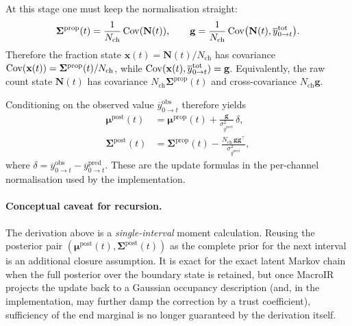 \documentclass[11pt]{article}
\begin{document}
At this stage one must keep the normalisation straight:
\[
  \boldsymbol{\Sigma}^{\text{prop}}(t)
  =
  \frac{1}{N_{\text{ch}}}\operatorname{Cov}(\mathbf{N}(t)),
  \qquad
  \mathbf{g}
  =
  \frac{1}{N_{\text{ch}}}
  \operatorname{Cov}\bigl(\mathbf{N}(t),\overline{y}^{\text{tot}}_{0\to t}\bigr).
\]
Therefore the fraction state
\(
  \mathbf{x}(t)=\mathbf{N}(t)/N_{\text{ch}}
\)
has covariance
\(
  \operatorname{Cov}(\mathbf{x}(t))=\boldsymbol{\Sigma}^{\text{prop}}(t)/N_{\text{ch}}
\),
while
\(
  \operatorname{Cov}(\mathbf{x}(t),\overline{y}^{\text{tot}}_{0\to t})=\mathbf{g}
\).
Equivalently, the raw count state \(\mathbf{N}(t)\) has covariance
\(
  N_{\text{ch}}\boldsymbol{\Sigma}^{\text{prop}}(t)
\)
and cross-covariance
\(
  N_{\text{ch}}\mathbf{g}
\).

Conditioning on the observed value
\(\overline{y}^{\text{obs}}_{0\to t}\) therefore yields
\begin{align*}
  \boldsymbol{\mu}^{\text{post}}(t)
  &=
  \boldsymbol{\mu}^{\text{prop}}(t)
  +
  \frac{\mathbf{g}}{\sigma^2_{\overline{y}^{\text{pred}}}}
  \,\delta,
  \\
  \boldsymbol{\Sigma}^{\text{post}}(t)
  &=
  \boldsymbol{\Sigma}^{\text{prop}}(t)
  -
  \frac{N_{\text{ch}}\,\mathbf{g}\mathbf{g}^\top}
       {\sigma^2_{\overline{y}^{\text{pred}}}},
\end{align*}
where
\(
  \delta
  =
  \overline{y}^{\text{obs}}_{0\to t}
  -\overline{y}^{\text{pred}}_{0\to t}.
\)
These are the update formulas in the per-channel normalisation used by the
implementation.

\paragraph{Conceptual caveat for recursion.}
The derivation above is a \emph{single-interval} moment calculation. Reusing the
posterior pair
\(
  (\boldsymbol{\mu}^{\text{post}}(t),\boldsymbol{\Sigma}^{\text{post}}(t))
\)
as the complete prior for the next interval is an additional closure
assumption. It is exact for the exact latent Markov chain when the full
posterior over the boundary state is retained, but once MacroIR projects the
update back to a Gaussian occupancy description (and, in the implementation,
may further damp the correction by a trust coefficient), sufficiency of the end
marginal is no longer guaranteed by the derivation itself.

\end{document}
